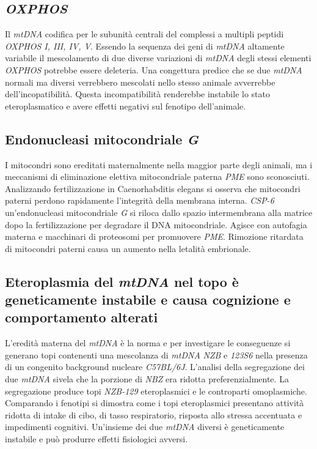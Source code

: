 	\subsection{\emph{OXPHOS}}
	Il \emph{mtDNA} codifica per le subunit\`a centrali del complessi a multipli peptidi \emph{OXPHOS I, III, IV, V}.
	Essendo la sequenza dei geni di \emph{mtDNA} altamente variabile il mescolamento di due diverse variazioni di \emph{mtDNA} degli stessi elementi \emph{OXPHOS} potrebbe essere deleteria.
	Una congettura predice che se due \emph{mtDNA} normali ma diversi verrebbero mescolati nello stesso animale avverrebbe dell'incopatibilit\`a.
	Questa incompatibilit\`a renderebbe instabile lo stato eteroplasmatico e avere effetti negativi sul fenotipo dell'animale.

	\subsection{Endonucleasi mitocondriale \emph{G}}
	I mitocondri sono ereditati maternalmente nella maggior parte degli animali, ma i meccanismi di eliminazione elettiva mitocondriale paterna \emph{PME} sono sconosciuti. 
	Analizzando fertilizzazione in Caenorhabditis elegans si osserva che mitocondri paterni perdono rapidamente l'integrit\`a della membrana interna. 
	\emph{CSP-6} un'endonucleasi mitocondriale \emph{G} si riloca dallo spazio intermembrana alla matrice dopo la fertilizzazione per degradare il DNA mitocondriale.
	Agisce con autofagia materna e macchinari di proteosomi per promuovere \emph{PME}.
	Rimozione ritardata di mitocondri paterni causa un aumento nella letalit\`a embrionale.

	\subsection{Eteroplasmia del \emph{mtDNA} nel topo \`e geneticamente instabile e causa cognizione e comportamento alterati}
	L'eredit\`a materna del \emph{mtDNA} \`e la norma e per investigare le conseguenze si generano topi contenenti una mescolanza di 
	\emph{mtDNA} \emph{NZB} e \emph{123S6} nella presenza di un congenito background nucleare \emph{C57BL/6J}.
	L'analisi della segregazione dei due \emph{mtDNA} sivela che la porzione di \emph{NBZ} era ridotta preferenzialmente.
	La segregazione produce topi \emph{NZB-129} eteroplasmici e le controparti omoplasmiche. 
	Comparando i fenotipi si dimostra come i topi eteroplasmici presentano attivit\`a ridotta di intake di cibo, di tasso respiratorio, risposta allo stressa accentuata e impedimenti cognitivi.
	Un'insieme dei due \emph{mtDNA} diversi \`e geneticamente instabile e pu\`o produrre effetti fisiologici avversi. 

